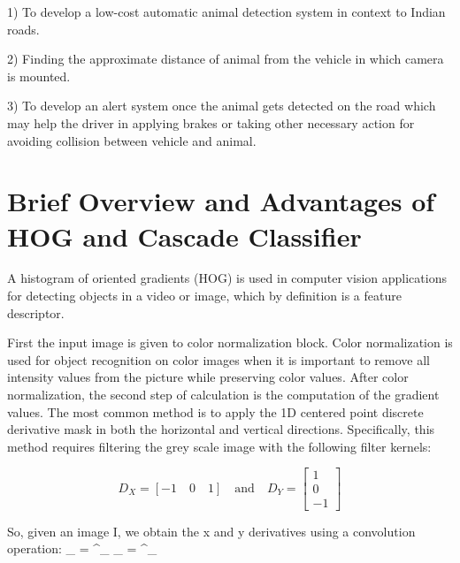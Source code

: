 \documentclass[14pt,a4paper,final]{extreport}
\begin{document}
\item 1) To develop a low-cost automatic animal detection system in context to Indian roads.

\item 2) Finding the approximate distance of animal from the vehicle in which camera is mounted.

\item 3) To develop an alert system once the animal gets detected on the road which may help the driver in applying brakes or taking other necessary action for avoiding collision between vehicle and animal.


\chapter{Brief Overview and Advantages of HOG and Cascade Classifier}
\item A histogram of oriented gradients (HOG) is used in computer vision applications for detecting objects in a video or image, which by definition is a feature descriptor.
\item First the input image is given to color normalization block. Color normalization is used for object recognition on color images when it is important to remove all intensity values from the picture while preserving color values. After color normalization, the second step of calculation is the computation of the gradient values. The most common method is to apply the 1D centered point discrete derivative mask in both the horizontal and vertical directions. Specifically, this method requires filtering the grey scale image with the following filter kernels:

\begin{equation*} D_{X}=[-1\quad 0\quad 1]\quad \text {and}\quad D_{Y}=\left [{\begin{array}{c} 1\\ 0\\ -1 \end{array}}\right ] \end{equation*}

\item So, given an image I, we obtain the x and y derivatives using a convolution operation: 
\newline
{}_{} =  ^\ast {}_{}
\newline
{}_{} =  ^\ast {}_{}
\end{document}

